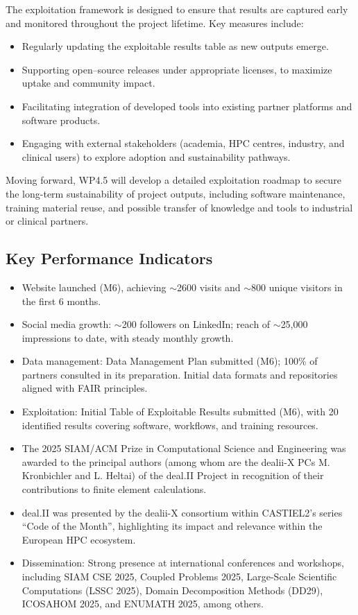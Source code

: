 \documentclass[a4paper,12pt, numbers]{article}
\begin{document}
The exploitation framework is designed to ensure that results are captured early and monitored throughout the project lifetime. Key measures include:  
\begin{itemize}[left=1em, itemsep=0pt, topsep=0pt]
\item Regularly updating the exploitable results table as new outputs emerge.  
\item Supporting open--source releases under appropriate licenses, to maximize uptake and community impact.  
\item Facilitating integration of developed tools into existing partner platforms and software products.  
\item Engaging with external stakeholders (academia, HPC centres, industry, and clinical users) to explore adoption and sustainability pathways.  
\end{itemize}

Moving forward, WP4.5 will develop a detailed exploitation roadmap to secure the long-term sustainability of project outputs, including software maintenance, training material reuse, and possible transfer of knowledge and tools to industrial or clinical partners.



\subsection{Key Performance Indicators} %
\begin{itemize}[left=1em, itemsep=0pt, topsep=0pt]
\item Website launched (M6), achieving $\sim$2600 visits and $\sim$800 unique visitors in the first 6 months.
\item Social media growth: $\sim$200 followers on LinkedIn; reach of $\sim$25,000 impressions to date, with steady monthly growth.
\item Data management: Data Management Plan submitted (M6); 100\% of partners consulted in its preparation. Initial data formats and repositories aligned with FAIR principles.
\item Exploitation: Initial Table of Exploitable Results submitted (M6), with 20 identified results covering software, workflows, and training resources.
\item The 2025 SIAM/ACM Prize in Computational Science and Engineering was awarded to the principal authors (among whom are the dealii-X PCs M. Kronbichler and L. Heltai) of the deal.II Project in recognition of their contributions to finite element calculations.
\item deal.II was presented by the dealii-X consortium within CASTIEL2's series ``Code of the Month'', highlighting its impact and relevance within the European HPC ecosystem. 
\item Dissemination: Strong presence at international conferences and workshops, including SIAM CSE 2025, Coupled Problems 2025, Large-Scale Scientific Computations (LSSC 2025), Domain Decomposition Methods (DD29), ICOSAHOM 2025, and ENUMATH 2025, among others.
\end{itemize}
\end{document}
